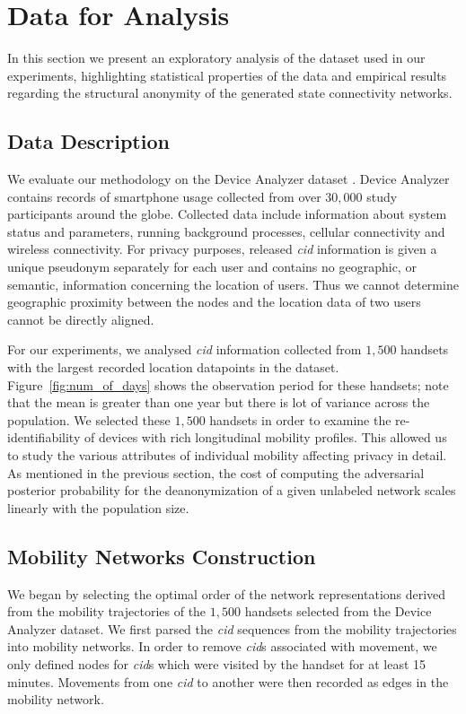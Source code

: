 \section{Data for Analysis}

In this section we present an exploratory analysis of the dataset used in our experiments, highlighting statistical properties of the data and empirical results regarding the structural anonymity of the generated state connectivity networks.

\subsection{Data Description}

We evaluate our methodology on the Device Analyzer dataset \cite{Wagner2014}. Device Analyzer contains records of smartphone usage collected from over $ 30,000 $  study participants around the globe.
Collected data include information about system status and parameters, running background processes, cellular connectivity and wireless connectivity.
For privacy purposes, released \emph{cid} information is given a unique pseudonym separately for each user and contains no geographic, or semantic, information concerning the location of users.
Thus we cannot determine geographic proximity between the nodes and the location data of two users cannot be directly aligned.

For our experiments, we analysed \emph{cid} information collected from $1,500$ handsets with the largest recorded location datapoints in the dataset.
Figure~\ref{fig:num_of_days} shows the observation period for these handsets; note that the mean is greater than one year but there is lot of variance across the population.
We selected these $1,500$ handsets in order to examine the re-identifiability of devices with rich longitudinal mobility profiles.
This allowed us to study the various attributes of individual mobility affecting privacy in detail.
As mentioned in the previous section, the cost of computing the adversarial posterior probability for the deanonymization of a given unlabeled network scales linearly with the population size.




\subsection{Mobility Networks Construction\label{sec:mobility-net-construct}}

We began by selecting the optimal order of the network representations derived from the mobility trajectories of the $1,500$ handsets selected from the Device Analyzer dataset.
We first parsed the \emph{cid} sequences from the mobility trajectories into mobility networks.
In order to remove \emph{cid}s associated with movement, we only defined nodes for \emph{cid}s which were visited by the handset for at least 15 minutes.
Movements from one \emph{cid} to another were then recorded as edges in the mobility network.

